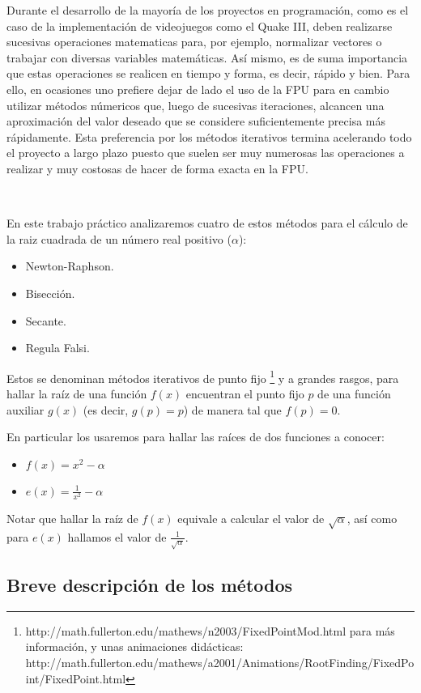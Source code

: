 Durante el desarrollo de la mayoría de los proyectos en programación, como es el caso de la implementación de videojuegos como el Quake III, deben realizarse sucesivas operaciones matematicas para, por ejemplo, normalizar vectores o trabajar con diversas variables matemáticas. Así mismo, es de 
suma importancia que estas operaciones se realicen en tiempo y forma, es decir, rápido y bien. Para ello, en ocasiones uno prefiere dejar de lado el uso de la FPU para en cambio utilizar métodos númericos que, luego de sucesivas iteraciones, alcancen una aproximación del valor deseado que se considere suficientemente precisa más rápidamente. Esta preferencia por los métodos iterativos termina acelerando todo el proyecto a largo plazo puesto que suelen ser muy numerosas las operaciones a realizar y muy costosas de hacer de forma exacta en la FPU.

~

En este trabajo práctico analizaremos cuatro de estos métodos para el cálculo de la raiz cuadrada de un número real positivo ($\alpha$): 
\begin{itemize}
	\item Newton-Raphson.
	\item Bisección.
	\item Secante.
	\item Regula Falsi.
\end{itemize}

Estos se denominan métodos iterativos de punto fijo \footnote{http://math.fullerton.edu/mathews/n2003/FixedPointMod.html para más información, y unas animaciones didácticas: http://math.fullerton.edu/mathews/a2001/Animations/RootFinding/FixedPoint/FixedPoint.html} y a grandes rasgos, para hallar la raíz de una función $f(x)$ encuentran el punto fijo $p$ de una función auxiliar $g(x)$ (es decir, $g(p) = p$) de manera tal que $f(p) = 0$. 

En particular los usaremos para hallar las raíces de dos funciones a conocer:

\begin{itemize}
	\item $f(x) = x^2 - \alpha$
	\item $\displaystyle e(x) = \frac{1}{x^2} - \alpha$
\end{itemize}

Notar que hallar la raíz de $f(x)$ equivale a calcular el valor de $\sqrt{\alpha}$, así como para $e(x)$ hallamos el valor de $\displaystyle 
\frac{1}{\sqrt{\alpha}}$.

\subsection{Breve descripción de los métodos}

